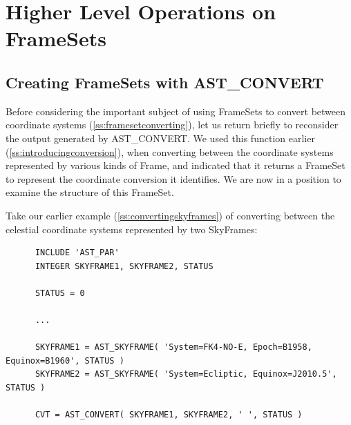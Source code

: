 \documentclass[twoside,11pt]{article}
\newcommand{\htmlref}[2]{#1}
\newcommand{\secref}[1]{\S\ref{#1}}
\renewcommand{\secref}[1]{\ref{#1}}
\begin{document}
\cleardoublepage
\section{\label{ss:fshigher}Higher Level Operations on FrameSets}

\subsection{\label{ss:framesetsfromconvert}Creating FrameSets with AST\_CONVERT}

Before considering the important subject of using FrameSets to convert
between coordinate systems (\secref{ss:framesetconverting}), let us
return briefly to reconsider the output generated by \htmlref{AST\_CONVERT}{AST_CONVERT}. We
used this function earlier (\secref{ss:introducingconversion}), when
converting between the coordinate systems represented by various kinds
of \htmlref{Frame}{Frame}, and indicated that it returns a \htmlref{FrameSet}{FrameSet} to represent the
coordinate conversion it identifies. We are now in a position to
examine the structure of this FrameSet.

Take our earlier example (\secref{ss:convertingskyframes}) of
converting between the celestial coordinate systems represented by two
SkyFrames:

\small
\begin{verbatim}
      INCLUDE 'AST_PAR'
      INTEGER SKYFRAME1, SKYFRAME2, STATUS

      STATUS = 0

      ...

      SKYFRAME1 = AST_SKYFRAME( 'System=FK4-NO-E, Epoch=B1958, Equinox=B1960', STATUS )
      SKYFRAME2 = AST_SKYFRAME( 'System=Ecliptic, Equinox=J2010.5', STATUS )

      CVT = AST_CONVERT( SKYFRAME1, SKYFRAME2, ' ', STATUS )
\end{verbatim}
\normalsize
\end{document}
